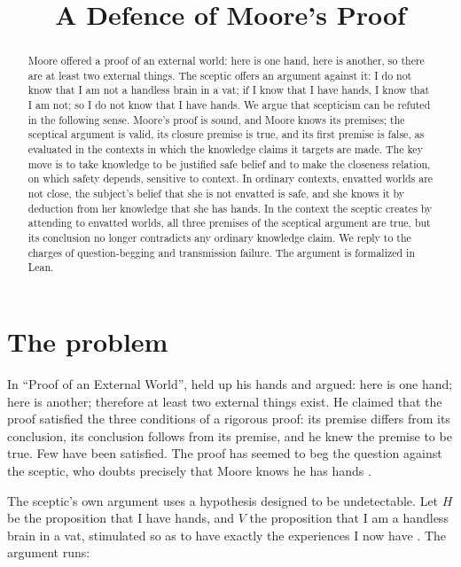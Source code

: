 \documentclass{situationist-preprint}
\title{A Defence of Moore's Proof}
\begin{document}
\maketitle

\begin{abstract}
Moore offered a proof of an external world: here is one hand, here is another, so there are at least two external things. The sceptic offers an argument against it: I do not know that I am not a handless brain in a vat; if I know that I have hands, I know that I am not; so I do not know that I have hands. We argue that scepticism can be refuted in the following sense. Moore's proof is sound, and Moore knows its premises; the sceptical argument is valid, its closure premise is true, and its first premise is false, as evaluated in the contexts in which the knowledge claims it targets are made. The key move is to take knowledge to be justified safe belief and to make the closeness relation, on which safety depends, sensitive to context. In ordinary contexts, envatted worlds are not close, the subject's belief that she is not envatted is safe, and she knows it by deduction from her knowledge that she has hands. In the context the sceptic creates by attending to envatted worlds, all three premises of the sceptical argument are true, but its conclusion no longer contradicts any ordinary knowledge claim. We reply to the charges of question-begging and transmission failure. The argument is formalized in Lean.
\end{abstract}

\section{The problem}

In \enquote{Proof of an External World}, \citet{Moore1939} held up his hands and argued: here is one hand; here is another; therefore at least two external things exist. He claimed that the proof satisfied the three conditions of a rigorous proof: its premise differs from its conclusion, its conclusion follows from its premise, and he knew the premise to be true. Few have been satisfied. The proof has seemed to beg the question against the sceptic, who doubts precisely that Moore knows he has hands \citep{Stroud1984}.

The sceptic's own argument uses a hypothesis designed to be undetectable. Let $H$ be the proposition that I have hands, and $V$ the proposition that I am a handless brain in a vat, stimulated so as to have exactly the experiences I now have \citep{Putnam1981}. The argument runs:
\end{document}

